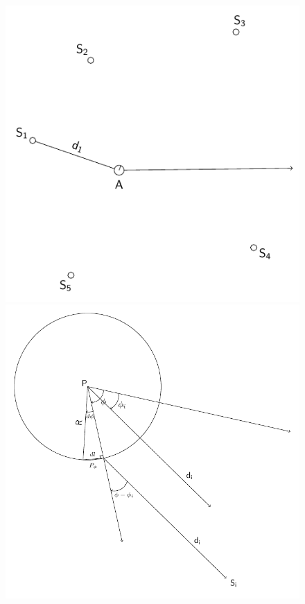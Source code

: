 \begin{figure}[!h]
\begin{minipage}{.5\linewidth}
	\centering
	\includegraphics[scale=.75]{groupSensor_Version2.pdf}
\end{minipage}\hfill
\begin{minipage}{.5\linewidth}
	\centering
	\includegraphics[scale=.6]{exposure.pdf}
\end{minipage}
\end{figure}

